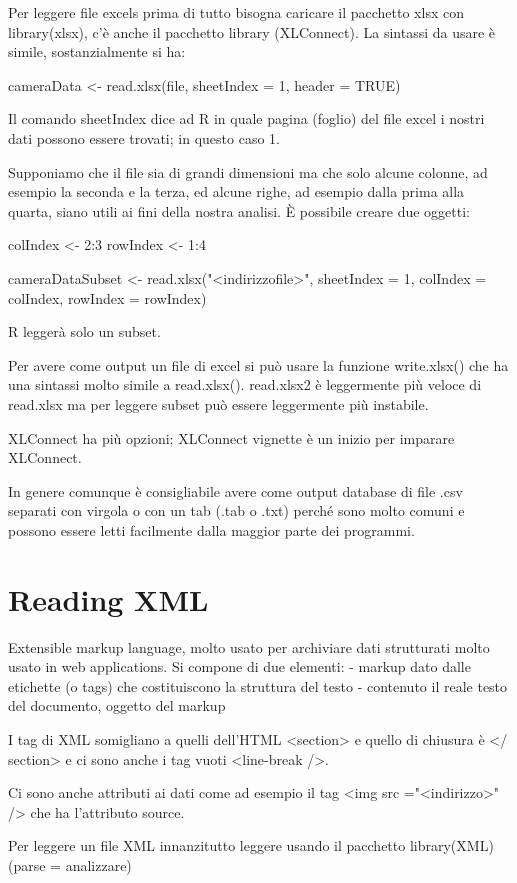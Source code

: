 Per leggere file excels prima di tutto bisogna caricare il pacchetto xlsx con library(xlsx), c'è anche il pacchetto library (XLConnect).
La sintassi da usare è simile, sostanzialmente si ha:

cameraData <- read.xlsx(file, sheetIndex = 1, header = TRUE)

Il comando sheetIndex dice ad R in quale pagina (foglio) del file excel i nostri dati
possono essere trovati; in questo caso 1.

Supponiamo che il file sia di grandi dimensioni ma che solo alcune colonne, ad esempio la seconda e la terza, ed alcune righe, ad esempio dalla prima alla quarta, siano utili ai fini della nostra analisi.
È possibile creare due oggetti:

colIndex <- 2:3
rowIndex <- 1:4

cameraDataSubset <- read.xlsx("<indirizzofile>", sheetIndex = 1, colIndex = colIndex, rowIndex = rowIndex)

R leggerà solo un subset.

Per avere come output un file di excel si può usare la funzione write.xlsx() che ha una sintassi molto simile a read.xlsx().
read.xlsx2 è leggermente più veloce di read.xlsx ma per leggere subset può essere leggermente più instabile.

XLConnect ha più opzioni; XLConnect vignette è un inizio per imparare XLConnect.

In genere comunque è consigliabile avere come output database di file .csv separati con virgola o con un tab (.tab o .txt) perché sono molto comuni e possono essere letti facilmente dalla maggior parte dei programmi.


\section{Reading XML}

Extensible markup language, molto usato per archiviare dati strutturati molto usato in web applications.
Si compone di due elementi:
- markup dato dalle etichette (o tags) che costituiscono la struttura del testo
- contenuto il reale testo del documento, oggetto del markup

I tag di XML somigliano a quelli dell'HTML <section> e quello di chiusura è </ section>
e ci sono anche i tag vuoti <line-break />.

Ci sono anche attributi ai dati come ad esempio il tag
<img src ="<indirizzo>" />
che ha l'attributo source.

Per leggere un file XML innanzitutto leggere usando il pacchetto library(XML) (parse =  analizzare)

